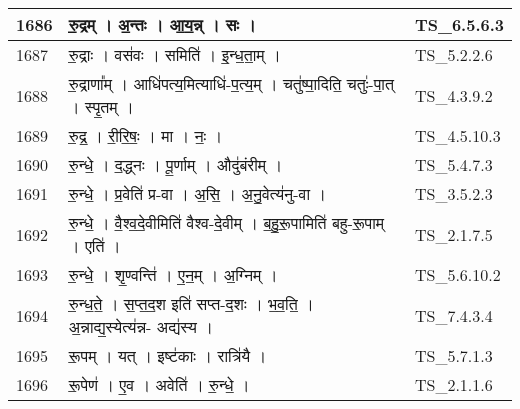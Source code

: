 \documentclass[17pt]{extarticle}
\begin{document}
\begin{longtable}{||p{0.4in}||p{4.9in}||p{0.9in}||}
    \hline
        
    1686 & रु॒द्रम्   ।   अ॒न्तः   ।   आ॒य॒न्न्   ।   सः   ।    & TS\_6.5.6.3       \\
    
    \hline
        
    1687 & रु॒द्राः   ।   वस॑वः   ।   समिति॑   ।   इ॒न्ध॒ता॒म्   ।    & TS\_5.2.2.6       \\
    
    \hline
        
    1688 & रु॒द्राणा᳚म्   ।   आधि॑पत्य॒मित्याधि॑{-}प॒त्य॒म्   ।   चतु॑ष्पा॒दिति॒ चतुः॑{-}पा॒त्   ।   स्पृ॒तम्   ।    & TS\_4.3.9.2       \\
    
    \hline
        
    1689 & रु॒द्र॒   ।   री॒रि॒षः॒   ।   मा   ।   नः॒   ।    & TS\_4.5.10.3       \\
    
    \hline
        
    1690 & रु॒न्धे॒   ।   द॒द्ध्नः   ।   पू॒र्णाम्   ।   औदु॑बंरीम्   ।    & TS\_5.4.7.3       \\
    
    \hline
        
    1691 & रु॒न्धे॒   ।   प्र॒वेति॑ प्र{-}वा   ।   अ॒सि॒   ।   अ॒नु॒वेत्य॑नु{-}वा   ।    & TS\_3.5.2.3       \\
    
    \hline
        
    1692 & रु॒न्धे॒   ।   वै॒श्व॒दे॒वीमिति॑ वैश्व{-}दे॒वीम्   ।   ब॒हु॒रू॒पामिति॑ बहु{-}रू॒पाम्   ।   एति॑   ।    & TS\_2.1.7.5       \\
    
    \hline
        
    1693 & रु॒न्धे॒   ।   शृ॒ण्वन्ति॑   ।   ए॒न॒म्   ।   अ॒ग्निम्   ।    & TS\_5.6.10.2       \\
    
    \hline
        
    1694 & रु॒न्ध॒ते॒   ।   स॒प्त॒द॒श इति॑ सप्त{-}द॒शः   ।   भ॒व॒ति॒   ।   अ॒न्नाद्य॒स्येत्य॑न्न{-} अद्य॑स्य   ।    & TS\_7.4.3.4       \\
    
    \hline
        
    1695 & रू॒पम्   ।   यत्   ।   इष्ट॑काः   ।   रात्रि॑यै   ।    & TS\_5.7.1.3       \\
    
    \hline
        
    1696 & रू॒पेण॑   ।   ए॒व   ।   अवेति॑   ।   रु॒न्धे॒   ।    & TS\_2.1.1.6       \\
    

\end{longtable}
\end{document}
